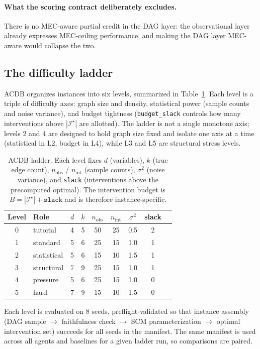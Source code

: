 \paragraph{What the scoring contract deliberately excludes.} There is no MEC-aware partial credit in the DAG layer: the observational layer already expresses MEC-ceiling performance, and making the DAG layer MEC-aware would collapse the two.

\subsection{The difficulty ladder}

ACDB organizes instances into six levels, summarized in Table~\ref{tab:ladder}. Each level is a triple of difficulty axes: graph size and density, statistical power (sample counts and noise variance), and budget tightness (\texttt{budget\_slack} controls how many interventions above $|\mathcal{I}^\star|$ are allotted). The ladder is not a single monotone axis; levels 2 and 4 are designed to hold graph size fixed and isolate one axis at a time (statistical in L2, budget in L4), while L3 and L5 are structural stress levels.

\begin{table}[t]
\centering
\caption{ACDB ladder. Each level fixes $d$ (variables), $k$ (true edge count), $n_{\mathrm{obs}}$ / $n_{\mathrm{int}}$ (sample counts), $\sigma^2$ (noise variance), and \texttt{slack} (interventions above the precomputed optimal). The intervention budget is $B = |\mathcal{I}^\star| + \texttt{slack}$ and is therefore instance-specific.}
\label{tab:ladder}
\begin{tabular}{cllcccccc}
\toprule
Level & Role & $d$ & $k$ & $n_{\mathrm{obs}}$ & $n_{\mathrm{int}}$ & $\sigma^2$ & slack \\
\midrule
0 & tutorial       & 4 & 5 & 50 & 25 & 0.5 & 2 \\
1 & standard       & 5 & 6 & 25 & 15 & 1.0 & 1 \\
2 & statistical    & 5 & 6 & 15 & 10 & 1.5 & 1 \\
3 & structural     & 7 & 9 & 25 & 15 & 1.0 & 1 \\
4 & pressure       & 5 & 6 & 25 & 15 & 1.0 & 0 \\
5 & hard           & 7 & 9 & 15 & 10 & 1.5 & 0 \\
\bottomrule
\end{tabular}
\end{table}

Each level is evaluated on 8 seeds, preflight-validated so that instance assembly (DAG sample $\to$ faithfulness check $\to$ SCM parameterization $\to$ optimal intervention set) succeeds for all seeds in the manifest. The same manifest is used across all agents and baselines for a given ladder run, so comparisons are paired.

